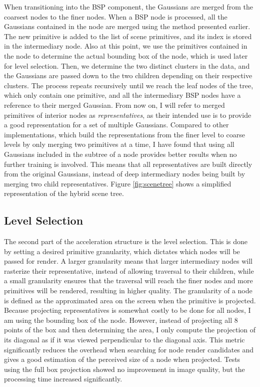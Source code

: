 When transitioning into the BSP component, the Gaussians are merged from the coarsest nodes to the finer nodes. When a BSP node is processed, all the Gaussians contained in the node are merged using the method presented earlier. The new primitive is added to the list of scene primitives, and its index is stored in the intermediary node. Also at this point, we use the primitives contained in the node to determine the actual bounding box of the node, which is used later for level selection. Then, we determine the two distinct clusters in the data, and the Gaussians are passed down to the two children depending on their respective clusters. The process repeats recursively until we reach the leaf nodes of the tree, which only contain one primitive, and all the intermediary BSP nodes have a reference to their merged Gaussian. From now on, I will refer to merged primitives of interior nodes as \textit{representatives}, as their intended use is to provide a good representation for a set of multiple Gaussians. Compared to other implementations, which build the representations from the finer level to coarse levels by only merging two primitives at a time, I have found that using all Gaussians included in the subtree of a node provides better results when no further training is involved. This means that all representatives are built directly from the original Gaussians, instead of deep intermediary nodes being built by merging two child representatives. Figure \ref{fig:scenetree} shows a simplified representation of the hybrid scene tree.

\subsection{Level Selection}
The second part of the acceleration structure is the level selection. This is done by setting a desired primitive granularity, which dictates which nodes will be passed for render. A larger granularity means that larger intermediary nodes will rasterize their representative, instead of allowing traversal to their children, while a small granularity ensures that the traversal will reach the finer nodes and more primitives will be rendered, resulting in higher quality. The granularity of a node is defined as the approximated area on the screen when the primitive is projected. Because projecting representatives is somewhat costly to be done for all nodes, I am using the bounding box of the node. However, instead of projecting all 8 points of the box and then determining the area, I only compute the projection of its diagonal as if it was viewed perpendicular to the diagonal axis. This metric significantly reduces the overhead when searching for node render candidates and gives a good estimation of the perceived size of a node when projected. Tests using the full box projection showed no improvement in image quality, but the processing time increased significantly.

